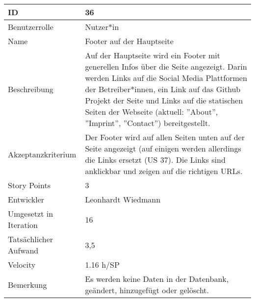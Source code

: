 \begin{tabularx}{\textwidth}{|p{}|X|}
	\hline
	ID & 36\\
	\hline
	Benutzerrolle & Nutzer*in\\
	\hline
	Name & Footer auf der Hauptseite\\
	\hline
	Beschreibung & Auf der Hauptseite wird ein Footer mit generellen Infos über die Seite angezeigt. Darin werden Links auf die Social Media Plattformen der Betreiber*innen, ein Link auf das Github Projekt der Seite und Links auf die statischen Seiten der Webseite (aktuell: ''About'', ''Imprint'', ''Contact'') bereitgestellt.\\
	\hline
	Akzeptanzkriterium & Der Footer wird auf allen Seiten unten auf der Seite angezeigt (auf einigen werden allerdings die Links ersetzt (US 37). Die Links sind anklickbar und zeigen auf die richtigen URLs.\\
	\hline
	Story Points & 3\\
	\hline
	Entwickler & Leonhardt Wiedmann\\
	\hline
	Umgesetzt in Iteration & 16\\
	\hline
	Tatsächlicher Aufwand & 3,5\\
	\hline
	Velocity & 1.16 h/SP\\
	\hline
	Bemerkung & Es werden keine Daten in der Datenbank, geändert, hinzugefügt oder gelöscht.\\
	\hline
\end{tabularx}
\vspace{20pt}
